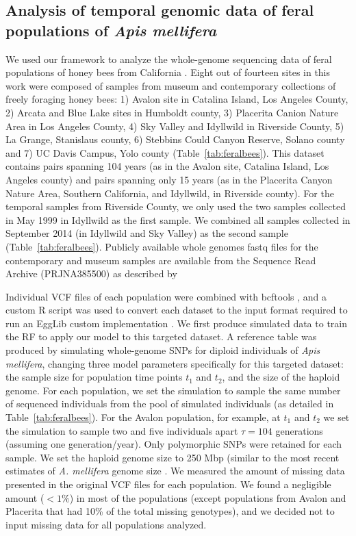 \documentclass[a4paper, 12pt]{article}
\begin{document}
\subsection*{Analysis of temporal genomic data of feral populations of \textit{Apis mellifera}} 

We used our framework to analyze the whole-genome sequencing data of feral populations of honey bees from California \citep{Cridland:2018fx}. Eight out of fourteen sites in this work were composed of samples from museum and contemporary collections of freely foraging honey bees: 1) Avalon site in Catalina Island, Los Angeles County, 2) Arcata and Blue Lake sites in Humboldt county, 3) Placerita Canion Nature Area in Los Angeles County, 4) Sky Valley and Idyllwild in Riverside County, 5) La Grange, Stanislaus county, 6) Stebbins Could Canyon Reserve, Solano county and 7) UC Davis Campus, Yolo county (Table~\ref{tab:feralbees}). This dataset contains pairs spanning 104 years (as in the Avalon site, Catalina Island, Los Angeles county) and pairs spanning only 15 years (as in the Placerita Canyon Nature Area, Southern California, and Idyllwild, in Riverside county). For the temporal samples from Riverside County, we only used the two samples collected in May 1999 in Idyllwild as the first sample. We combined all samples collected in September 2014 (in Idyllwild and Sky Valley) as the second sample (Table~\ref{tab:feralbees}). Publicly available whole genomes fastq files for the contemporary and museum samples are available from the Sequence Read Archive (PRJNA385500) as described by \citet{Cridland:2018fx}

Individual VCF files of each population were combined with bcftools \citep{Li:2011kr}, and a custom R script was used to convert each dataset to the input format required to run an EggLib custom implementation \citep[in][]{Pavinato:2021}. We first produce simulated data to train the RF to apply our model to this targeted dataset. A reference table was produced by simulating whole-genome SNPs for diploid individuals of \textit{Apis mellifera}, changing three model parameters specifically for this targeted dataset: the sample size for population time points $t_1$ and $t_2$, and the size of the haploid genome. For each population, we set the simulation to sample the same number of sequenced individuals from the pool of simulated individuals (as detailed in Table~\ref{tab:feralbees}). For the Avalon population, for example, at $t_1$ and $t_2$ we set the simulation to sample two and five individuals apart $\tau = 104$ generations (assuming one generation/year). Only polymorphic SNPs were retained for each sample. We set the haploid genome size to 250 Mbp (similar to the most recent estimates of \textit{A. mellifera} genome size \citep{Elsik:2014hf}. We measured the amount of missing data presented in the original VCF files \citep{Cridland:2018fx} for each population. We found a negligible amount ($< 1\%$) in most of the populations (except populations from Avalon and Placerita that had 10\% of the total missing genotypes), and we decided not to input missing data for all populations analyzed.
\end{document}
